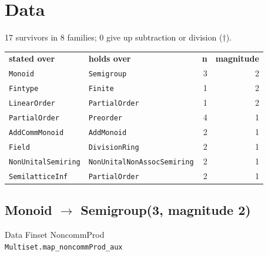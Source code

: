 \documentclass[10pt,a4paper]{article}
\begin{document}
\clearpage
\section{Data}
17 survivors in 8 families; 0 give up subtraction or division ($\dagger$).

\begin{center}
\begin{tabular}{llrr}
\textbf{stated over} & \textbf{holds over} & \textbf{n} & \textbf{magnitude}\\[2pt]
\texttt{\small Monoid} & \texttt{\small Semigroup} & 3 & 2\\
\texttt{\small Fintype} & \texttt{\small Finite} & 1 & 2\\
\texttt{\small LinearOrder} & \texttt{\small PartialOrder} & 1 & 2\\
\texttt{\small PartialOrder} & \texttt{\small Preorder} & 4 & 1\\
\texttt{\small AddCommMonoid} & \texttt{\small AddMonoid} & 2 & 1\\
\texttt{\small Field} & \texttt{\small DivisionRing} & 2 & 1\\
\texttt{\small NonUnitalSemiring} & \texttt{\small NonUnitalNonAssocSemiring} & 2 & 1\\
\texttt{\small SemilatticeInf} & \texttt{\small PartialOrder} & 2 & 1\\
\end{tabular}
\end{center}

\subsection*{Monoid $\to$ Semigroup\quad\textmd{\small (3, magnitude 2)}}
{\footnotesize\color{locator}Data\,\textperiodcentered\,Finset\,\textperiodcentered\,NoncommProd}\\
\hspace*{1em}\texttt{\small Multiset.\allowbreak{}map\_noncommProd\_aux}\\
\end{document}
